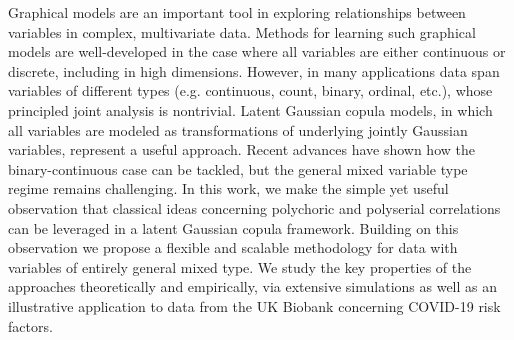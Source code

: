 
\noindent Graphical models are an important tool in exploring relationships between variables in complex, multivariate data. Methods for learning such graphical models are well-developed in the case where all variables are either continuous or discrete, including in high dimensions. However, in many applications data span variables of different types (e.g. continuous, count, binary, ordinal, etc.), whose principled joint analysis is nontrivial. Latent Gaussian copula models, in which all variables are modeled as transformations of underlying jointly Gaussian variables, represent a useful approach. Recent advances have shown how the binary-continuous case can be tackled, but the general mixed variable type regime remains challenging. In this work, we make the simple yet useful observation that classical ideas concerning polychoric and polyserial correlations can be leveraged in a latent Gaussian copula framework. Building on this observation we propose a flexible and scalable methodology for data with variables of entirely general mixed type. We study the key properties of the approaches theoretically and empirically, via extensive simulations as well as an illustrative application to data from the UK Biobank concerning COVID-19 risk factors.